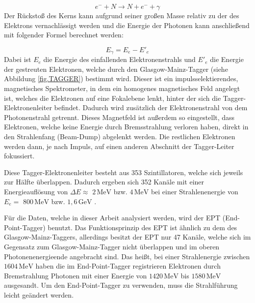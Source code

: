 \documentclass[a4paper,11pt,oneside,final,german,openbib,pdftex]{scrbook}
\begin{document}
{ \begin{equation}
 e^{-}+N\rightarrow N + e^{-}+\gamma
 \label{eq.Streuung}
 \end{equation}
  Der R\"ucksto{\ss} des Kerns kann aufgrund seiner gro{\ss}en Masse relativ zu der des Elektrons vernachl\"assigt werden und die Energie der Photonen kann anschlie{\ss}end mit folgender Formel berechnet werden:
  
  \begin{equation}
  E_{\gamma}= E_{e^{}}-E'_{e}
  \label{eq.Photonenenergie}
  \end{equation}
 Dabei ist $E_e$ die Energie des einfallenden Elektronenstrahls und $E'_{e}$ die Energie der gestreuten Elektronen, welche durch den Glasgow-Mainz-Tagger (siehe Abbildung \ref{fig.TAGGER}) bestimmt wird.
 Dieser ist ein impulsselektierendes, magnetisches Spektrometer, in dem ein homogenes magnetisches Feld angelegt ist, welches die Elektronen auf eine Fokalebene lenkt, hinter der sich die Tagger-Elektronenleiter befindet. Dadurch wird zus\"atzlich der Elektronenstrahl von dem Photonenstrahl getrennt. Dieses Magnetfeld ist außerdem so eingestellt, dass Elektronen, welche keine Energie durch Bremsstrahlung verloren haben, direkt in den Strahlenfang (Beam-Dump) abgelenkt werden. Die restlichen Elektronen werden dann, je nach Impuls, auf einen anderen Abschnitt der Tagger-Leiter fokussiert.
 
 Diese Tagger-Elektronenleiter besteht aus 353 Szintillatoren, welche sich jeweils zur H\"alfte \"uberlappen.
 Dadurch ergeben sich 352 Kan\"ale mit einer Energieaufl\"osung von $\Delta E \approx$  $2\,\text{MeV}$ bzw. $4\,\text{MeV}$ bei einer Strahlenenergie von $E_e=$ $800 \,\text{MeV}$ bzw. $1,6\,\text{GeV}$
 \cite{We13}. 
 
 F\"ur die Daten, welche in dieser Arbeit analysiert werden, wird der EPT (End-Point-Tagger) benutzt. Das Funktionsprinzip des EPT ist \"ahnlich zu dem des Glasgow-Mainz-Taggers, allerdings besitzt der EPT nur 47 Kan\"ale, welche sich im Gegensatz zum Glasgow-Mainz-Tagger nicht \"uberlappen und im oberen Photonenenergieende angebracht sind. Das heißt, bei einer Strahlenergie zwischen $1604\,\text{MeV}$ haben die im End-Point-Tagger registrieren Elektronen durch Bremstrahlung Photonen mit einer Energie von $1420 \,\text{MeV}$ bis $1580\,\text{MeV}$ ausgesandt. Um den End-Point-Tagger zu verwenden, muss die Strahlf\"uhrung leicht ge\"andert werden\cite{Ne17}.
 
}
\end{document}
